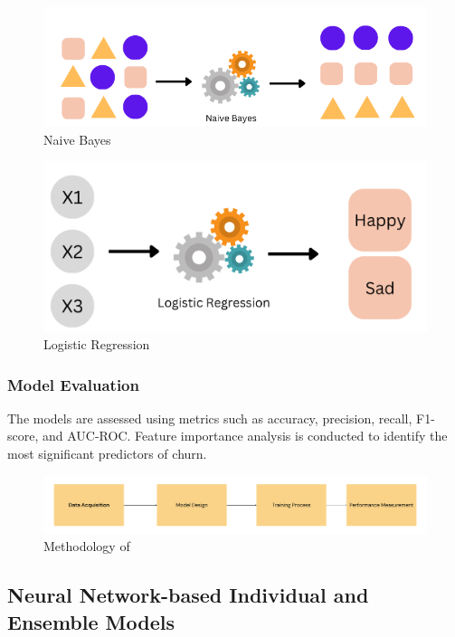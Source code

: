 \begin{figure}[H]
    \centering
    \includegraphics[width=1\textwidth]{img/Naive Bayes.png}
    \caption{Naive Bayes}
    \label{fig:Naive Bayes}
\end{figure}
\begin{figure}[H]
    \centering
    \includegraphics[width=.8\textwidth]{img/Logistic Regression.png}
    \caption{Logistic Regression}
    \label{fig:Logistic Regression}
\end{figure}
\subsubsection{Model Evaluation}

The models are assessed using metrics such as accuracy, precision, recall, F1-score, and AUC-ROC.
Feature importance analysis is conducted to identify the most significant predictors of churn.

\begin{figure}[H]
    \centering
    \includegraphics[width=1\textwidth]{img/model 1.png}
    \caption{Methodology of \cite{Agarwal2022-cq}}
    \label{fig:Methodology of paper 3}
\end{figure}

\subsection{Neural Network-based Individual and Ensemble Models}
